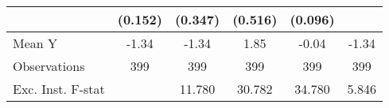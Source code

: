 {\begin{tabular}{l*{5}{c}}
            &     (0.152)         &     (0.347)         &     (0.516)         &     (0.096)         &                     \\
\midrule
Mean Y      &       -1.34         &       -1.34         &        1.85         &       -0.04         &       -1.34         \\
Observations&         399         &         399         &         399         &         399         &         399         \\
Exc. Inst. F-stat&                     &      11.780         &      30.782         &      34.780         &       5.846         \\
\bottomrule
\end{tabular}
}
